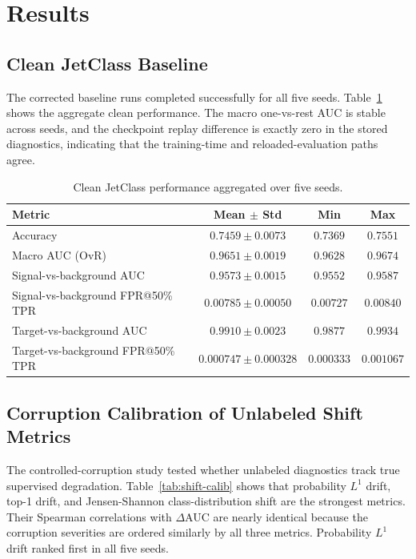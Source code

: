 \section{Results}
\label{sec:results}

\subsection{Clean JetClass Baseline}

The corrected baseline runs completed successfully for all five seeds. Table~\ref{tab:clean-aggregate} shows the aggregate clean performance. The macro one-vs-rest AUC is stable across seeds, and the checkpoint replay difference is exactly zero in the stored diagnostics, indicating that the training-time and reloaded-evaluation paths agree.

\begin{table}[t]
\centering
\caption{Clean JetClass performance aggregated over five seeds.}
\label{tab:clean-aggregate}
\begin{tabular}{lccc}
\toprule
Metric & Mean $\pm$ Std & Min & Max \\
\midrule
Accuracy & $0.7459 \pm 0.0073$ & $0.7369$ & $0.7551$ \\
Macro AUC (OvR) & $0.9651 \pm 0.0019$ & $0.9628$ & $0.9674$ \\
Signal-vs-background AUC & $0.9573 \pm 0.0015$ & $0.9552$ & $0.9587$ \\
Signal-vs-background FPR@50\% TPR & $0.00785 \pm 0.00050$ & $0.00727$ & $0.00840$ \\
Target-vs-background AUC & $0.9910 \pm 0.0023$ & $0.9877$ & $0.9934$ \\
Target-vs-background FPR@50\% TPR & $0.000747 \pm 0.000328$ & $0.000333$ & $0.001067$ \\
\bottomrule
\end{tabular}
\end{table}

\subsection{Corruption Calibration of Unlabeled Shift Metrics}

The controlled-corruption study tested whether unlabeled diagnostics track true supervised degradation. Table~\ref{tab:shift-calib} shows that probability $L^1$ drift, top-1 drift, and Jensen-Shannon class-distribution shift are the strongest metrics. Their Spearman correlations with $\Delta$AUC are nearly identical because the corruption severities are ordered similarly by all three metrics. Probability $L^1$ drift ranked first in all five seeds.

